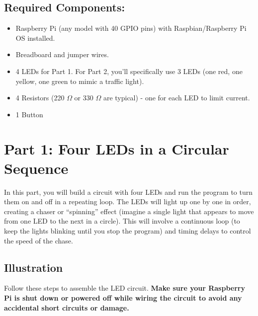 \documentclass[a4paper,11pt]{article}
\begin{document}
\subsection*{Required Components:}
\begin{itemize}
    \item Raspberry Pi (any model with 40 GPIO pins) with Raspbian/Raspberry Pi OS installed. 
\item Breadboard and jumper wires.
\item 4 LEDs for Part 1. For Part 2, you’ll specifically use 3 LEDs (one red, one yellow, one green to mimic a traffic light).
\item 4 Resistors (220 $\Omega$ or 330 $\Omega$ are typical) - one for each LED to limit current. 
\item 1 Button
\end{itemize}


\newpage
\section*{Part 1: Four LEDs in a Circular Sequence}
In this part, you will build a circuit with four LEDs and run
the program to turn them on and off in a repeating loop. 
The LEDs will light up one by one in order, creating a chaser 
or “spinning” effect (imagine a single light that appears to move 
from one LED to the next in a circle). This will involve a continuous loop 
(to keep the lights blinking until you stop the program) 
and timing delays to control the speed of the chase.

\subsection*{Illustration}

Follow these steps to assemble the LED circuit. \textbf{Make sure your Raspberry Pi 
is shut down or powered off while wiring the circuit to avoid any accidental 
short circuits or damage.}
\end{document}
